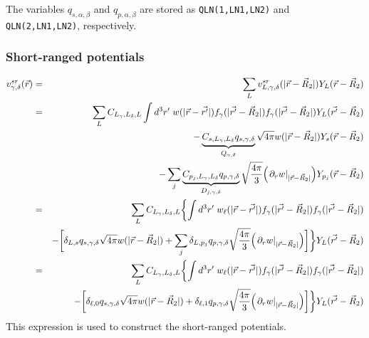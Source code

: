 \documentclass[11pt,a4paper]{report}
\begin{document}
The variables $q_{s,\alpha,\beta}$ and $q_{p,\alpha,\beta}$ are stored
as \verb|QLN(1,LN1,LN2)| and \verb|QLN(2,LN1,LN2)|, respectively.

\subsubsection{Short-ranged potentials}
\begin{eqnarray}
v^{sr}_{\gamma,\delta}(\vec{r})
&=&\sum_L v^{sr}_{L,\gamma,\delta}(|\vec{r}-\vec{R}_2|)Y_L(\vec{r}-\vec{R}_2)
\nonumber\\
%
%
&=&
\sum_L C_{L_\gamma,L_\delta,L}
\int d^3r'\; 
w(|\vec{r}-\vec{r'}|)
f_{\gamma}(|\vec{r'}-\vec{R}_2|)
f_{\gamma}(|\vec{r'}-\vec{R}_2|)
Y_L(\vec{r'}-\vec{R}_2)
\nonumber\\
%
%
&&-\underbrace{C_{s,L_\gamma,L_\delta}q_{s,\gamma,\delta}}_{Q_{\gamma,\delta}}
\sqrt{4\pi}w(|\vec{r}-\vec{R}_2|)Y_s(\vec{r}-\vec{R}_2)
\nonumber\\
&&-\sum_j
\underbrace{C_{p_j,L_\gamma,L_\delta}q_{p,\gamma,\delta}}_{D_{j,\gamma,\delta}}
\sqrt{\frac{4\pi}{3}}\Bigl(\left.\partial_rw\right|_{|\vec{r}-\vec{R}_2|}\Bigr)Y_{p_j}(\vec{r}-\vec{R}_2)
\nonumber\\
%
%
&=&
\sum_L C_{L_\gamma,L_\delta,L}
\biggl\lbrace
\int d^3r'\; 
w_\ell(|\vec{r}-\vec{r'}|)
f_{\gamma}(|\vec{r'}-\vec{R}_2|)
f_{\gamma}(|\vec{r'}-\vec{R}_2|)
\nonumber\\
%
%
&&-\biggl[\delta_{L,s}q_{s,\gamma,\delta}
\sqrt{4\pi}w(|\vec{r}-\vec{R}_2|)
+\sum_j
\delta_{L,p_j}q_{p,\gamma,\delta}
\sqrt{\frac{4\pi}{3}} \Bigl(\left.\partial_rw\right|_{|\vec{r}-\vec{R}_2|}\Bigr)
\biggr]
\biggr\rbrace
Y_L(\vec{r'}-\vec{R}_2)
\nonumber\\
%
%
&=&
\sum_L C_{L_\gamma,L_\delta,L}
\biggl\lbrace
\int d^3r'\; 
w_\ell(|\vec{r}-\vec{r'}|)
f_{\gamma}(|\vec{r'}-\vec{R}_2|)
f_{\gamma}(|\vec{r'}-\vec{R}_2|)
\nonumber\\
%
%
&&-\biggl[\delta_{\ell,0}q_{s,\gamma,\delta}
\sqrt{4\pi}w(|\vec{r}-\vec{R}_2|)
+
\delta_{\ell,1}q_{p,\gamma,\delta}
\sqrt{\frac{4\pi}{3}} \Bigl(\left.\partial_rw\right|_{|\vec{r}-\vec{R}_2|}\Bigr)
\biggr]
\biggr\rbrace
Y_L(\vec{r'}-\vec{R}_2)
\end{eqnarray}
This expression is used to construct the short-ranged potentials.


\end{document}
